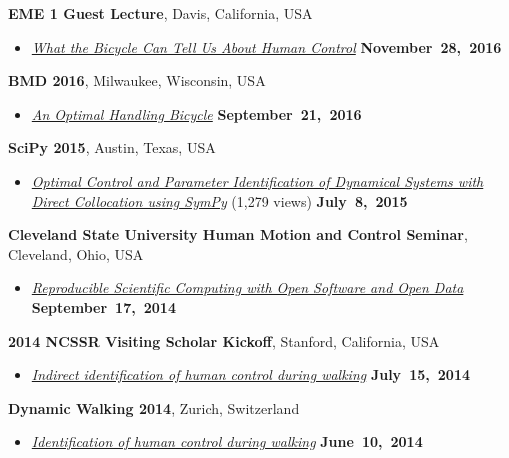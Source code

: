 \documentclass[10pt]{article}
\newenvironment{outerlist}[1][\enskip\textbullet]%
        {\begin{itemize}[#1]}{\end{itemize}%
         \vspace{-.6\baselineskip}}
\newcommand{\blankline}{\quad\pagebreak[2]}
\begin{document}
\blankline

\textbf{EME 1 Guest Lecture}, Davis, California, USA
\begin{outerlist}
\item[]
  \href{http://www.moorepants.info/presentations/2016/EME001/#/}{\textit{What
    the Bicycle Can Tell Us About Human Control}}
    \hfill \textbf{November~28,~2016}
\end{outerlist}

\blankline

\textbf{BMD 2016}, Milwaukee, Wisconsin, USA
\begin{outerlist}
\item[]
  \href{http://www.moorepants.info/presentations/2016/BMD2016/}{\textit{
    An Optimal Handling Bicycle}}
    \hfill \textbf{September~21,~2016}
\end{outerlist}

\blankline

\textbf{SciPy 2015}, Austin, Texas, USA
\begin{outerlist}
\item[]
  \href{https://youtu.be/ZJiYs2HuQy8}{\textit{
    Optimal Control and Parameter Identification of Dynamical Systems with
Direct Collocation using SymPy}} (1,279 views)
    \hfill \textbf{July~8,~2015}
\end{outerlist}

\blankline

\textbf{Cleveland State University Human Motion and Control Seminar}, Cleveland, Ohio, USA
\begin{outerlist}
\item[]
  \href{http://www.moorepants.info/presentations/2014/csu-fall-hmc-seminar}{\textit{Reproducible
    Scientific Computing with Open Software and Open Data}}
    \hfill \textbf{September~17,~2014}
\end{outerlist}

\blankline

\textbf{2014 NCSSR Visiting Scholar Kickoff}, Stanford, California, USA
\begin{outerlist}
\item[]
  \href{http://www.moorepants.info/presentations/2014/ncssr-kickoff}{\textit{Indirect
      identification of human control during walking}}
    \hfill \textbf{July~15,~2014}
\end{outerlist}

\blankline

\textbf{Dynamic Walking 2014}, Zurich, Switzerland
\begin{outerlist}
\item[]
  \href{http://www.moorepants.info/presentations/2014/DW2014}{\textit{Identification
  of human control during walking}}
    \hfill \textbf{June~10,~2014}
\end{outerlist}
\end{document}
